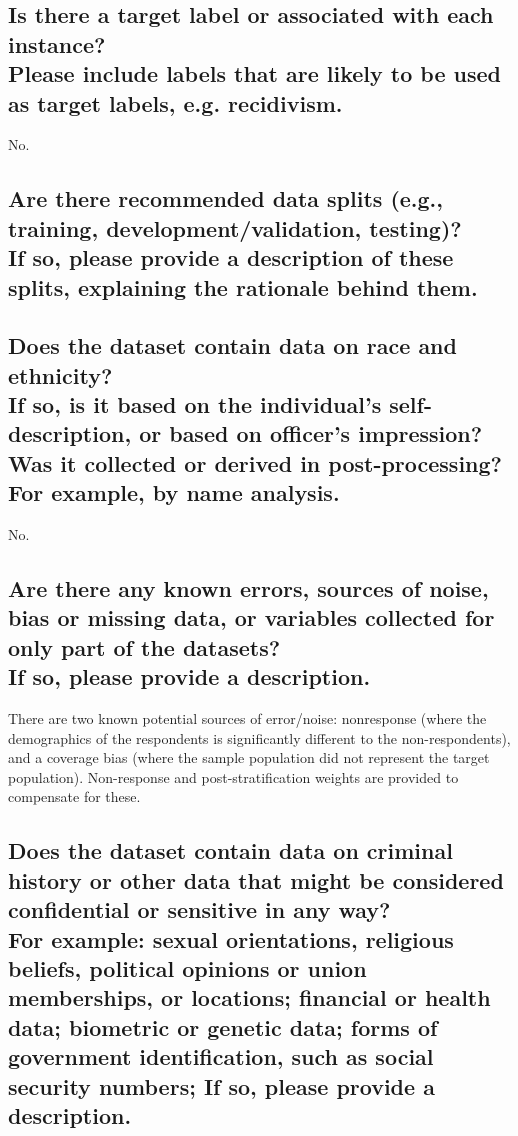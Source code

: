 \documentclass[letterpaper, 10 pt, conference]{ieeeconf}  %
\newcommand{\subtitle}[1]{{\\ \small \normalfont \color{purple} #1}}
\begin{document}
\subsection{Is there a target label or associated with each instance? \subtitle{Please include labels that are likely to be used as target labels, e.g. recidivism.}}

No.

\subsection{Are there recommended data splits (e.g., training, development/validation, testing)? \subtitle{If so, please provide a description of these splits, explaining the rationale behind them.}}
\subsection{Does the dataset contain data on race and ethnicity? \subtitle{If so, is it based on the individual's self-description, or based on officer's impression? Was it collected or derived in post-processing? For example, by name analysis.}}

No.

\subsection{Are there any known errors, sources of noise, bias or missing data, or variables collected for only part of the datasets? \subtitle{If so, please provide a description.}}

There are two known potential sources of error/noise: nonresponse (where the demographics of the respondents is significantly different to the non-respondents), and a coverage bias (where the sample population did not represent the target population). Non-response and post-stratification weights are provided to compensate for these.

\subsection{Does the dataset contain data on criminal history or other data that might be considered confidential or sensitive in any way? \subtitle{For example: sexual orientations, religious beliefs, political opinions or union memberships, or locations; financial or health data; biometric or genetic data; forms of government identification, such as social security numbers; If so, please provide a description.}}
\end{document}
